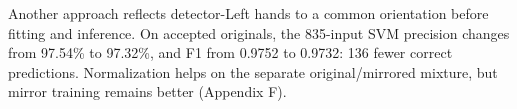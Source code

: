 Another approach reflects detector-Left hands to a common orientation before fitting and inference. On accepted originals, the 835-input SVM precision changes from 97.54\% to 97.32\%, and F1 from 0.9752 to 0.9732: 136 fewer correct predictions. Normalization helps on the separate original/mirrored mixture, but mirror training remains better (Appendix F).

